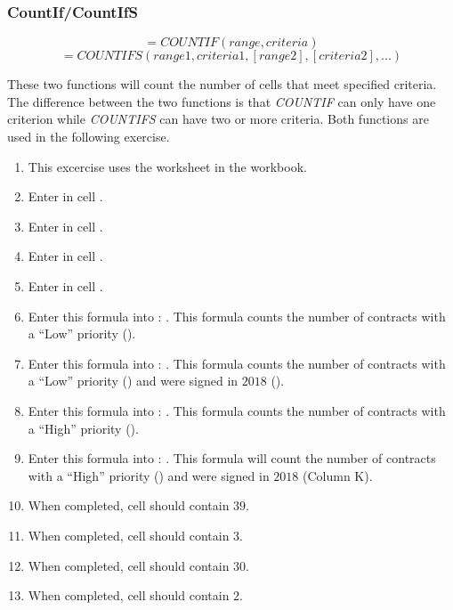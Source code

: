 \subsubsection{CountIf/CountIfS}

\[ =COUNTIF(range, criteria) \]
\[ =COUNTIFS(range1, criteria1, [range2], [criteria2], ...) \]

These two functions will count the number of cells that meet specified criteria. The difference between the two functions is that \textit{COUNTIF} can only have one criterion while \textit{COUNTIFS} can have two or more criteria. Both functions are used in the following exercise.

\begin{enumerate}
	\item This excercise uses the  worksheet in the  workbook.
	\item Enter  in cell .
	\item Enter  in cell .
	\item Enter  in cell .
	\item Enter  in cell .
	\item Enter this formula into : . This formula counts the number of contracts with a ``Low'' priority ().
	\item Enter this formula into : . This formula counts the number of contracts with a ``Low'' priority () and were signed in $ 2018 $ ().
	\item Enter this formula into : . This formula counts the number of contracts with a ``High'' priority ().
	\item Enter this formula into : . This formula will count the number of contracts with a ``High'' priority () and were signed in $ 2018 $ (Column K).
	\item When completed, cell  should contain $ 39 $.
	\item When completed, cell  should contain $ 3 $.
	\item When completed, cell  should contain $ 30 $.
	\item When completed, cell  should contain $ 2 $.
	

\end{enumerate}
